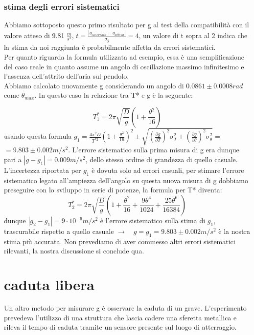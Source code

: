 \documentclass[a4paper]{article}
\theoremstyle{definition}
\begin{document}
\subsubsection*{stima degli errori sistematici}
Abbiamo sottoposto questo primo risultato per g al test della compatibilità con il valore atteso di 9.81 \(\frac{m}{s^{2}}\), \(t= \frac{\left | g_{osservata} - g_{attesa} \right |}{\sigma_{g}} = 4\), un valore di t sopra al 2 indica che la stima da noi raggiunta è probabilmente affetta da errori sistematici.\\
Per quanto riguarda la formula utilizzata ad esempio, essa è una semplificazione del caso reale in quanto assume un angolo di oscillazione massimo infinitesimo e l'assenza dell'attrito dell'aria sul pendolo.\\
Abbiamo calcolato nuovamente g considerando un angolo di \(0.0861 \pm 0.0008 rad\) come \(\theta _{max}\). In questo caso la relazione tra T* e g è la seguente:

\[T^{*}_{1} = 2\pi \sqrt{\frac{D}{g}} \left (1+\frac{\theta ^{2}}{16} \right )\]
usando questa formula \(g_{1} = \frac{4\pi ^{2}D}{T^{*2}}\left ( 1+\frac{\theta ^{2}}{16} \right )^{2} \pm \sqrt{\left ( \frac{\partial g}{\partial T} \right )^{2}\sigma _{T}^{2}+\left ( \frac{\partial g}{\partial \theta }\right )^{2}\sigma _{\theta }^{2} }=\)\\\(=9.803\pm0.002 m/s^{2}\). L'errore sistematico sulla prima misura di g era dunque pari a \( \left | g-g_{1} \right | =  0.009 m/s^{2}\), dello stesso ordine di grandezza di quello casuale.\\
L'incertezza riportata per \(g_{1}\) è dovuta solo ad errori casuali, per stimare l'errore sistematico legato all'ampiezza dell'angolo su questa nuova misura di g dobbiamo preseguire con lo sviluppo in serie di potenze, la formula per T* diventa:
\[ T^{*}_{2}= 2\pi \sqrt{\frac{D}{g}} \left (1+\frac{\theta ^{2}}{16}+\frac{9\theta ^{4}}{1024}+\frac{25\theta ^{6}}{16384} \right )\] 
dunque \( \left | g_{2}-g_{1} \right | =  9 \cdot 10^{-6} m/s^{2}\) è l'errore sistematico sulla stima di \(g_{1}\), trascurabile rispetto a quello casuale \( \rightarrow \quad g = g_{1} = 9.803 \pm 0.002 m/s^{2}\) è la nostra stima più accurata. Non prevediamo di aver commesso altri errori sistematici rilevanti, la nostra discussione si conclude qua.
\section*{caduta libera}
Un altro metodo per misurare g è osservare la caduta di un grave. L'esperimento prevedeva l'utilizzo di una struttura che lascia cadere una sferetta metallica e rileva il tempo di caduta tramite un sensore presente sul luogo di atterraggio.
\end{document}
